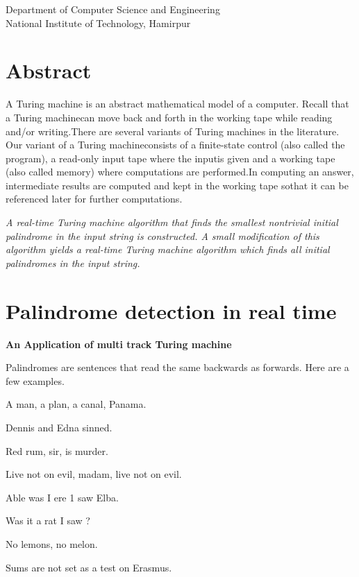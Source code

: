 \documentclass[11pt,a4paper]{report}
\begin{document}
\begin{titlepage}
\begin{center}
        \vspace{25pt}
        
        \large
 
        Department of Computer Science and  Engineering\\
        National Institute of Technology, Hamirpur\\
      
    \end{center}
\end{titlepage}


\chapter*{Abstract}

A Turing machine is an abstract mathematical model of a computer. Recall that a Turing machinecan move back and forth in the working tape while reading and/or writing.There are several variants of Turing machines in the literature. Our variant of a Turing machineconsists of a finite-state control (also called the program), a read-only input tape where the inputis given and a working tape (also called memory) where computations are performed.In computing an answer, intermediate results are computed and kept in the working tape sothat it can be referenced later for further computations.

\vspace{5pt}
\textit{A real-time Turing machine algorithm that finds the smallest nontrivial initial palindrome in the input string is constructed. A small modification of this algorithm yields
a real-time Turing machine algorithm which finds all initial palindromes in the input
string. 
}


\pagestyle{plain}


\pagebreak

\tableofcontents

\chapter{Palindrome detection in real time}
\begin{center}
    

\textbf{An Application of multi track Turing machine}
\end{center}
Palindromes are sentences that read the same backwards as forwards. Here are a few
examples.

\begin{center}
    
A man, a plan, a canal, Panama.

Dennis and Edna sinned.

Red rum, sir, is murder.

Live not on evil, madam, live not on evil.

Able was I ere 1 saw Elba.

Was it a rat I saw ?

No lemons, no melon.

Sums are not set as a test on Erasmus.
\end{center}
\end{document}
